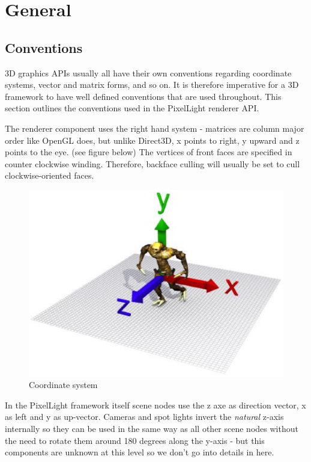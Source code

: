 \section{General}




\subsection{Conventions}
3D graphics \ac{API}s usually all have their own conventions regarding coordinate systems, vector and matrix forms, and so on. It is therefore imperative for a 3D framework to have well defined conventions that are used throughout. This section outlines the conventions used in the PixelLight renderer \ac{API}.

The renderer component uses the right hand system - matrices are column major order like OpenGL does, but unlike Direct3D, x points to right, y upward and z points to the eye. (see figure below) The vertices of front faces are specified in counter clockwise winding. Therefore, backface culling will usually be set to cull clockwise-oriented faces.

\begin{figure}
  \centering
  \includegraphics[scale=0.7]{pics/CoordinateSystem.eps}
  \caption{Coordinate system}
  \label{fig:Coordinate system}
\end{figure}

In the PixelLight framework itself scene nodes use the z axe as direction vector, x as left and y as up-vector. Cameras and spot lights invert the \emph{natural} z-axis internally so they can be used in the same way as all other scene nodes without the need to rotate them around 180 degrees along the y-axis - but this components are unknown at this level so we don't go into details in here.




